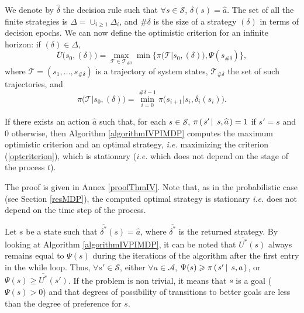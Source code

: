 We denote by $\widehat{\delta}$ the decision rule 
such that $\forall s \in \mathcal{S}$, $\widehat{\delta}(s)=\widehat{a}$. 
The set of all the finite strategies is 
$\Delta =\cup_{i \geqslant 1} \Delta_i$, 
and $\# \delta$ is the size of a strategy $(\delta)$ 
in terms of decision epochs. 
We can now define the optimistic criterion 
for an infinite horizon: 
if $(\delta) \in \Delta$,
\begin{equation} 
\label{optcriterion} 
\overline{U} \Big( s_0,(\delta) \Big) 
= \max_{ \mathcal{T} \in \mathcal{T}_{\# \delta}} 
\min \bigg\{ \pi \Big( \mathcal{T} \Big\vert s_0, (\delta) \Big), \Psi(s_{\# \delta}) \bigg\},
\end{equation}
where $\mathcal{T} = (s_1,\ldots,s_{\# \delta})$ is a trajectory of system states,
$\mathcal{T}_{\# \delta}$ the set of such trajectories,
and 
\[ \pi \Big( \mathcal{T} \Big\vert s_0, (\delta) \Big) 
= \min_{i=0}^{\# \delta - 1} \pi \Big( s_{i+1} \Big\vert s_i, \delta_i(s_i)  \Big). \]
\begin{theorem}
\label{thmIV} If there exists an action $\widehat{a}$ such that, 
for each $s \in \mathcal{S}$, $\pi \left( \left. s' \, \right| \left. \, s, \widehat{a}  \right. \right) = 1$ 
if $s'=s$ and $0$ otherwise, 
then Algorithm \ref{algorithmIVPIMDP} 
computes the maximum optimistic criterion 
and an optimal strategy,
\textit{i.e.} maximizing the criterion (\ref{optcriterion}),
which is stationary 
(\textit{i.e.} which does not depend on the stage of the process $t$).
\end{theorem}
The proof is given in Annex \ref{proofThmIV}. Note that, as in the probabilistic case
(see Section \ref{resMDP}), the computed optimal strategy is stationary
\textit{i.e.} does not depend on the time step of the process.

Let $s$ be a state such that $\overline{\delta^*}(s)=\widehat{a}$, 
where $\overline{\delta^*}$ is the returned strategy. 
By looking at Algorithm \ref{algorithmIVPIMDP}, 
it can be noted that $\overline{U^*}(s)$ 
always remains equal to $\Psi(s)$ 
during the iterations of the algorithm
after the first entry in the while loop.
Thus, $\forall s' \in \mathcal{S}$, 
either $\forall a \in \mathcal{A}$, 
$\Psi(s) \geqslant \pi \left( \left. s' \, \right| \left. \, s,a \right. \right)$, 
or $\Psi(s) \geqslant \overline{U^*}(s')$. 
If the problem is non trivial, 
it means that $s$ is a goal ($\Psi(s)>0$) 
and that degrees of possibility of transitions to better goals 
are less than the degree of preference for $s$.

